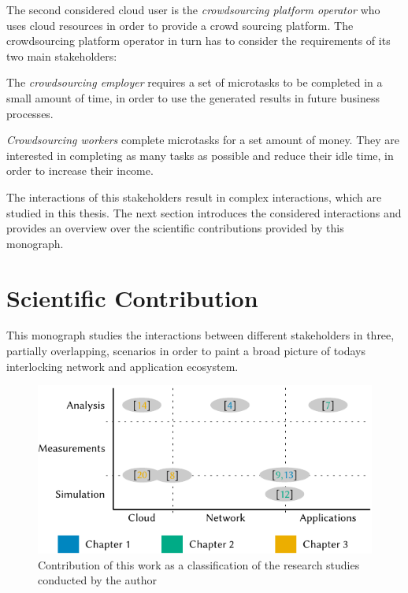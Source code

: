 The second considered cloud user is the \emph{crowdsourcing platform operator} who uses cloud resources in order to provide a crowd sourcing platform.
The crowdsourcing platform operator in turn has to consider the requirements of its two main stakeholders:

The \emph{crowdsourcing employer} requires a set of microtasks to be completed in a small amount of time, in order to use the generated results in future business processes.

\emph{Crowdsourcing workers} complete microtasks for a set amount of money.
They are interested in completing as many tasks as possible and reduce their idle time, in order to increase their income.

The interactions of this stakeholders result in complex interactions, which are studied in this thesis.
The next section introduces the considered interactions and provides an overview over the scientific contributions provided by this monograph.
\section{Scientific Contribution}
This monograph studies the interactions between different stakeholders in three, partially overlapping, scenarios in order to paint a broad picture of todays interlocking network and application ecosystem.

\begin{figure}
\centering
\includegraphics{figures/publications}
\caption{Contribution of this work as a classification of the research studies conducted by the author}\label{fig:introduction:publications}
\end{figure}

